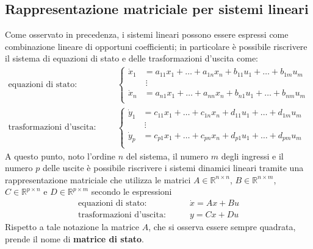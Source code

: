 	\subsection{Rappresentazione matriciale per sistemi lineari} Come osservato in precedenza, i sistemi lineari possono essere espressi come combinazione lineare di opportuni coefficienti; in particolare è possibile riscrivere il sistema di equazioni di stato e delle trasformazioni d'uscita come:
	\begin{equation}
	\begin{aligned}
		\textrm{equazioni di stato:} \qquad & \begin{cases}
			\dot x_1 & = a_{11} x_1 + \dots + a_{1n}x_n + b_{11}u_1 + \dots + b_{1m}u_m \\
			& \ \vdots \\
			\dot x_n & = a_{n1} x_1 + \dots + a_{nn}x_n + b_{n1}u_1 + \dots + b_{nm}u_m \\
		\end{cases} \\
		\textrm{trasformazioni d'uscita:} \qquad & \begin{cases}
		\dot y_1 & = c_{11} x_1 + \dots + c_{1n}x_n + d_{11}u_1 + \dots + d_{1m}u_m \\
		& \ \vdots \\
		\dot y_p & = c_{p1} x_1 + \dots + c_{pn}x_n + d_{p1}u_1 + \dots + d_{pm}u_m \\
		\end{cases}
	\end{aligned}
	\end{equation}
	A questo punto, noto l'ordine $n$ del sistema, il numero $m$ degli ingressi e il numero $p$ delle uscite è possibile riscrivere i sistemi dinamici lineari tramite una rappresentazione matriciale che utilizza le matrici $A\in \mathds R^{n\times n}$, $B\in \mathds R^{n\times m}$, $C\in \mathds R^{p\times n }$ e $D\in \mathds R^{p\times m}$ secondo le espressioni
	\begin{equation} \label{eq:rapp-matriciale}
	\begin{aligned}
		\textrm{equazioni di stato:} & \qquad \dot x = Ax + Bu \\
		\textrm{trasformazioni d'uscita:} & \qquad y = Cx + Du
	\end{aligned}
	\end{equation}
	Rispetto a tale notazione la matrice $A$, che si osserva essere sempre quadrata, prende il nome di \textbf{matrice di stato}.
	
	
